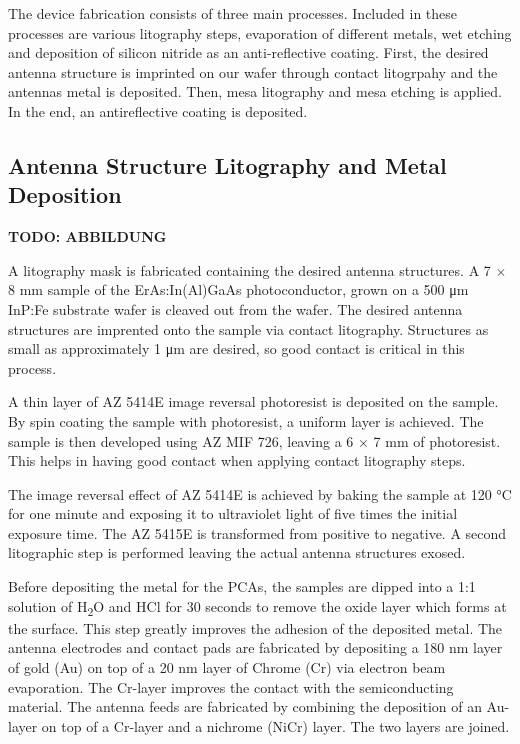 The device fabrication consists of three main processes. Included in these processes are various litography steps, evaporation of different metals, wet etching and deposition of silicon nitride as an anti-reflective coating. First, the desired antenna structure is imprinted on our wafer through contact litogrpahy and the antennas metal is deposited. Then, mesa litography and mesa etching is applied. In the end, an antireflective coating is deposited. 

\subsection{Antenna Structure Litography and Metal Deposition}

\textbf{TODO: ABBILDUNG}

A litography mask is fabricated containing the desired antenna structures. A \num{7} $\times$ \num{8} \si{\milli\meter} sample of the ErAs:In(Al)GaAs photoconductor, grown on a \num{500} \si{\micro\meter} InP:Fe substrate wafer is cleaved out from the wafer. The desired antenna structures are imprented onto the sample via contact litography. Structures as small as approximately \num{1} \si{\micro\meter} are desired, so good contact is critical in this process. 

A thin layer of AZ 5414E image reversal photoresist is deposited on the sample. By spin coating the sample with photoresist, a uniform layer is achieved. The sample is then developed using AZ MIF 726, leaving a \num{6} $\times$ \num{7} \si{\milli\meter} of photoresist. This helps in having good contact when applying contact litography steps.

The image reversal effect of AZ 5414E is achieved by baking the sample at \num{120} \si{\celsius} for one minute and exposing it to ultraviolet light of five times the initial exposure time. The AZ 5415E is transformed from positive to negative. A second litographic step is performed leaving the actual antenna structures exosed. 

Before depositing the metal for the PCAs, the samples are dipped into a 1:1 solution of H\textsubscript{2}O and HCl for \num{30} seconds to remove the oxide layer which forms at the surface. This step greatly improves the adhesion of the deposited metal. The antenna electrodes and contact pads are fabricated by depositing a \num{180} \si{\nano\meter} layer of gold (Au) on top of a \num{20} \si{\nano\meter} layer of Chrome (Cr) via electron beam evaporation. The Cr-layer improves the contact with the semiconducting material. The antenna feeds are fabricated by combining the deposition of an Au-layer on top of a Cr-layer and a nichrome (NiCr) layer. The two layers are joined.  

